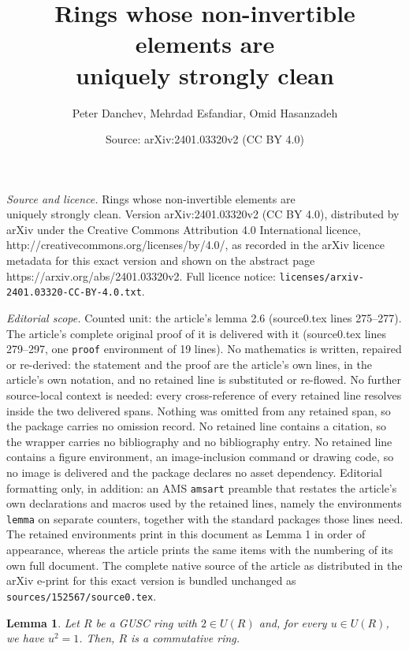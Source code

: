 \documentclass[10pt,a4paper]{amsart}
\title{\small Rings whose non-invertible elements are \\ uniquely strongly clean}
\author{Peter Danchev, Mehrdad Esfandiar, Omid Hasanzadeh}
\date{Source: arXiv:2401.03320v2 (CC BY 4.0)}
\newtheorem{lemma}{Lemma}
\begin{document}
\maketitle

\noindent\emph{Source and licence.} \small Rings whose non-invertible elements are \\ uniquely strongly clean. Version arXiv:2401.03320v2 (CC BY 4.0), distributed by arXiv under the Creative Commons Attribution 4.0 International licence, http://creativecommons.org/licenses/by/4.0/, as recorded in the arXiv licence metadata for this exact version and shown on the abstract page https://arxiv.org/abs/2401.03320v2. Full licence notice: \texttt{licenses/arxiv-2401.03320-CC-BY-4.0.txt}.\par\smallskip

\noindent\textit{Editorial scope.} Counted unit: the article's lemma 2.6 (source0.tex lines 275--277). The article's complete original proof of it is delivered with it (source0.tex lines 279--297, one \texttt{proof} environment of 19 lines). No mathematics is written, repaired or re-derived: the statement and the proof are the article's own lines, in the article's own notation, and no retained line is substituted or re-flowed.  No further source-local context is needed: every cross-reference of every retained line resolves inside the two delivered spans.  Nothing was omitted from any retained span, so the package carries no omission record.  No retained line contains a citation, so the wrapper carries no bibliography and no bibliography entry.  No retained line contains a figure environment, an image-inclusion command or drawing code, so no image is delivered and the package declares no asset dependency.  Editorial formatting only, in addition: an AMS \texttt{amsart} preamble that restates the article's own declarations and macros used by the retained lines, namely the environments \texttt{lemma} on separate counters, together with the standard packages those lines need.  The retained environments print in this document as Lemma 1 in order of appearance, whereas the article prints the same items with the numbering of its own full document.  The complete native source of the article as distributed in the arXiv e-print for this exact version is bundled unchanged as \texttt{sources/152567/source0.tex}.
\begin{lemma}\label{lemma 2.6}
Let $R$ be a GUSC ring with $2 \in U(R)$ and, for every $u \in U(R)$, we have $u^2 = 1$. Then, $R$ is a commutative ring.
\end{lemma}
\end{document}
